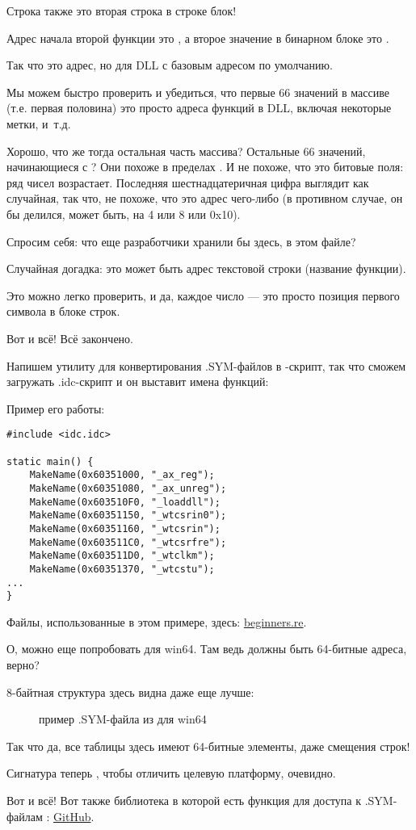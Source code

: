 Строка  также это вторая строка в строке блок!

Адрес начала второй функции это , а второе значение в бинарном блоке это .

Так что это адрес, но для DLL с базовым адресом по умолчанию.

Мы можем быстро проверить и убедиться, что первые 66 значений в массиве (т.е. первая половина)
это просто адреса функций в DLL, включая некоторые метки, и~т.д.

Хорошо, что же тогда остальная часть массива? 
Остальные 66 значений, начинающиеся с ? 
Они похоже в пределах \TT{[0...0x3F8]}. 
И не похоже, что это битовые поля: ряд чисел возрастает.
Последняя шестнадцатеричная цифра выглядит как случайная, так что, не похоже, что это
адрес чего-либо (в противном случае, он бы делился, может быть, на 4 или 8 или 0x10).

Спросим себя: что еще разработчики \oracle хранили бы здесь, в этом файле?

Случайная догадка: это может быть адрес текстовой строки (название функции).

Это можно легко проверить, и да, каждое число --- это просто позиция первого символа в блоке строк.

Вот и всё! Всё закончено.

Напишем утилиту для конвертирования .SYM-файлов в \IDA-скрипт, 
так что сможем загружать .idc-скрипт и он выставит имена функций:



Пример его работы:

\begin{lstlisting}[style=customc]
#include <idc.idc>

static main() {
	MakeName(0x60351000, "_ax_reg");
	MakeName(0x60351080, "_ax_unreg");
	MakeName(0x603510F0, "_loaddll");
	MakeName(0x60351150, "_wtcsrin0");
	MakeName(0x60351160, "_wtcsrin");
	MakeName(0x603511C0, "_wtcsrfre");
	MakeName(0x603511D0, "_wtclkm");
	MakeName(0x60351370, "_wtcstu");
...
}
\end{lstlisting}

Файлы, использованные в этом примере, здесь: \href{http://go.yurichev.com/17216}{beginners.re}.

\clearpage
О, можно еще попробовать \oracle для win64.
Там ведь должны быть 64-битные адреса, верно?

8-байтная структура здесь видна даже еще лучше:

\begin{figure}[H]
\centering
{}
\caption{пример .SYM-файла из \oracle для win64}
\label{fig:oracle_SYM_whole64}
\end{figure}

Так что да, все таблицы здесь имеют 64-битные элементы, даже смещения строк!

Сигнатура теперь , чтобы отличить целевую платформу, очевидно.

Вот и всё!
Вот также библиотека в которой есть функция для доступа к .SYM-файлам \oracle{}:
\href{http://go.yurichev.com/17007}{GitHub}.
